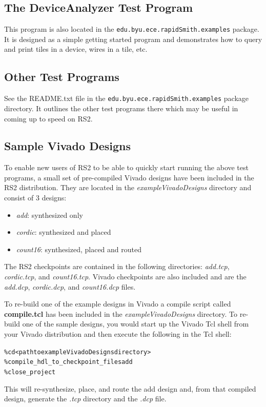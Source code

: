 \documentclass[12pt]{article}
\newcommand{\fil}[1]{{\em #1}}
\newcommand{\pkg}[1]{{\texttt{#1}}}
\newcommand{\pgm}[1]{{\textbf{#1}}}
\newcommand{\dir}[1]{{\em #1}}
\newcommand{\sbr}[1]{{\em #1}}
\newenvironment{code}{\begin{center} \begin{minipage}{6in} \noindent \begin{alltt}}{\end{alltt} \end{minipage} \end{center}}
\begin{document}
\subsection{The \pgm{DeviceAnalyzer} Test Program}
This program is also located in the \pkg{edu.byu.ece.rapidSmith.examples}
package.  It is designed as a simple getting started program and demonstrates
how to query and print tiles in a device, wires in a tile, etc.

\subsection{Other Test Programs}
See the README.txt file in the \pkg{edu.byu.ece.rapidSmith.examples} package
directory.  It outlines the other test programs there which may be useful in
coming up to speed on RS2. 

\subsection{Sample Vivado Designs}
To enable new users of RS2 to be able to quickly start running the above test
programs, a small set of pre-compiled Vivado designs have been included in the
RS2 distribution.  They are located in the \dir{exampleVivadoDesigns} directory
and consist of 3 designs: 
\begin{itemize}
\item \sbr{add}: synthesized only
\item \sbr{cordic}: synthesized and placed
\item \sbr{count16}: synthesized, placed and routed
\end{itemize} 
The RS2 checkpoints are contained in
the following directories: \dir{add.tcp}, \dir{cordic.tcp}, and
\dir{count16.tcp}.
Vivado checkpoints are also included and are the \fil{add.dcp},
\fil{cordic.dcp}, and \fil{count16.dcp} files.  

To re-build one of the example designs in Vivado a compile script called
\pgm{compile.tcl} has been included in the \dir{exampleVivadoDesigns}
directory.  To re-build one of the sample designs, you would start up the Vivado
Tcl shell from your Vivado distribution and then execute the following in the Tcl shell:                
\vspace{-0.15in}  \begin{code}
	\% cd <path to exampleVivadoDesigns directory>
	\% compile_hdl_to_checkpoint_files add
	\% close_project
\end{code}
This will re-synthesize, place, and route the add design and, from that compiled
design, generate the \dir{.tcp} directory and the \fil{.dcp} file.
\end{document}
